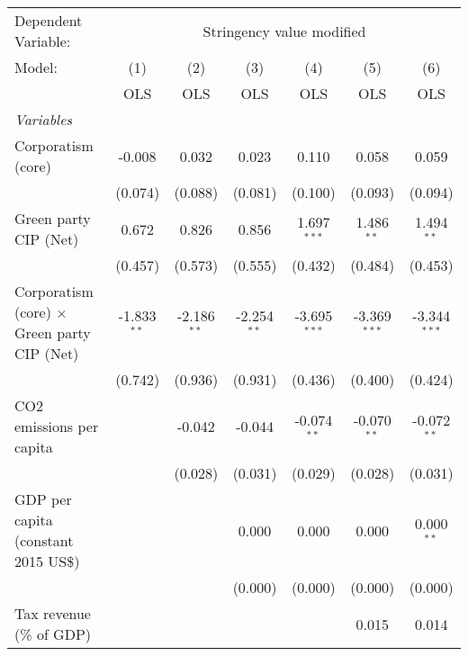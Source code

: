
\begingroup
\centering
\begin{tabular}{lcccccc}
   \toprule
   Dependent Variable: & \multicolumn{6}{c}{Stringency value modified}\\
   Model:                                             & (1)           & (2)           & (3)           & (4)            & (5)            & (6)\\  
                                                      &  OLS          & OLS           & OLS           & OLS            & OLS            & OLS\\  
   \midrule
   \emph{Variables}\\
   Corporatism (core)                                 & -0.008        & 0.032         & 0.023         & 0.110          & 0.058          & 0.059\\   
                                                      & (0.074)       & (0.088)       & (0.081)       & (0.100)        & (0.093)        & (0.094)\\   
   Green party CIP (Net)                              & 0.672         & 0.826         & 0.856         & 1.697$^{***}$  & 1.486$^{**}$   & 1.494$^{**}$\\   
                                                      & (0.457)       & (0.573)       & (0.555)       & (0.432)        & (0.484)        & (0.453)\\   
   Corporatism (core) $\times$ Green party CIP (Net)  & -1.833$^{**}$ & -2.186$^{**}$ & -2.254$^{**}$ & -3.695$^{***}$ & -3.369$^{***}$ & -3.344$^{***}$\\   
                                                      & (0.742)       & (0.936)       & (0.931)       & (0.436)        & (0.400)        & (0.424)\\   
   CO2 emissions per capita                           &               & -0.042        & -0.044        & -0.074$^{**}$  & -0.070$^{**}$  & -0.072$^{**}$\\   
                                                      &               & (0.028)       & (0.031)       & (0.029)        & (0.028)        & (0.031)\\   
   GDP per capita (constant 2015 US\$)                &               &               & 0.000         & 0.000          & 0.000          & 0.000$^{**}$\\   
                                                      &               &               & (0.000)       & (0.000)        & (0.000)        & (0.000)\\   
   Tax revenue (\% of GDP)                            &               &               &               &                & 0.015          & 0.014\\   

\end{tabular}
